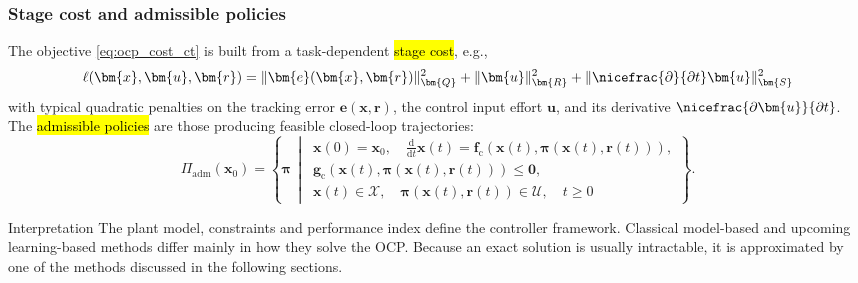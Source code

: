 \begin{frame}
	\frametitle{Stage cost and admissible policies}
	The objective \eqref{eq:ocp_cost_ct} is built from a task-dependent \hl{stage cost}, e.g.,
	\begin{equation}
		\ell(\bm{x},\bm{u},\bm{r})=
		\|\bm{e}(\bm{x},\bm{r})\|_{\bm{Q}}^2
		+\|\bm{u}\|_{\bm{R}}^2
		+\|\nicefrac{\partial}{\partial t}\bm{u}\|_{\bm{S}}^2
		\label{eq:ocp_stage_cost}
	\end{equation}\pause
	with typical quadratic penalties on the tracking error $\bm{e}(\bm{x},\bm{r})$, the control input effort $\bm{u}$, and its derivative $\nicefrac{\partial \bm{u}}{\partial t}$.
	The \hl{admissible policies} are those producing feasible closed-loop trajectories:
	\begin{equation}
		\Pi_\mathrm{adm}(\bm{x}_0)=
		\left\{
		\bm{\pi}\,\middle|\,
		\begin{array}{l}
			\bm{x}(0)=\bm{x}_0,\quad
			\frac{\mathrm{d}}{\mathrm{d}t}\bm{x}(t)=\bm{f}_\mathrm{c}(\bm{x}(t),\bm{\pi}(\bm{x}(t),\bm{r}(t))), \\
			\bm{g}_\mathrm{c}(\bm{x}(t),\bm{\pi}(\bm{x}(t),\bm{r}(t)))\leq\bm{0},                               \\
			\bm{x}(t)\in\mathcal{X},\quad
			\bm{\pi}(\bm{x}(t),\bm{r}(t))\in\mathcal{U},\quad t\geq0
		\end{array}
		\right\} .
		\label{eq:admissible_policy_set}
	\end{equation}\pause\vspace{-0.3cm}
	\begin{varblock}{Interpretation}
		The plant model, constraints and performance index define the controller framework. Classical model-based and upcoming learning-based methods differ mainly in how they solve the OCP. Because an exact solution is usually intractable, it is approximated by one of the methods discussed in the following sections.
	\end{varblock}
\end{frame}

